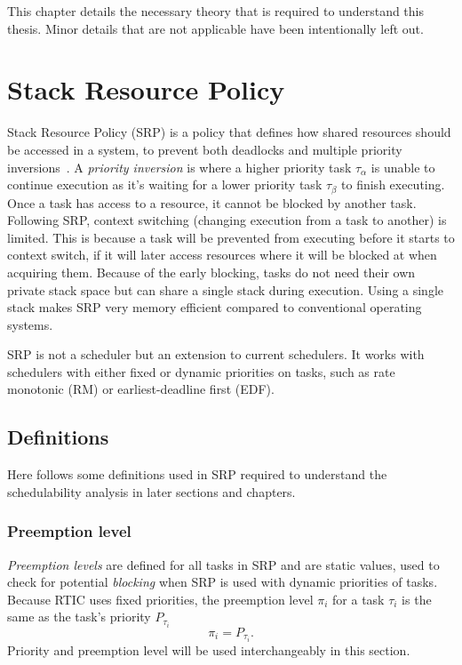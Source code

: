 This chapter details the necessary theory that is required to understand this thesis.
Minor details that are not applicable have been intentionally left out.

\section{Stack Resource Policy}
\label{theory:srp}
Stack Resource Policy (SRP) is a policy that defines how shared resources
should be accessed in a system, to prevent both deadlocks and multiple priority
inversions~\cite{srp}. A \emph{priority inversion} is where a higher priority
task $\tau_\alpha$ is unable to continue execution as it's waiting for a lower
priority task $\tau_\beta$ to finish executing. Once a task has access to a
resource, it cannot be blocked by another task. Following SRP, context
switching (changing execution from a task to another) is limited. This is
because a task will be prevented from executing before it starts to context
switch, if it will later access resources where it will be blocked at when
acquiring them. Because of the early blocking, tasks do not need their own
private stack space but can share a single stack during execution. Using a
single stack makes SRP very memory efficient compared to conventional operating
systems\cite{hardrealtimecomputingsystems}.

SRP is not a scheduler but an extension to current schedulers. It works with
schedulers with either fixed or dynamic priorities on tasks, such as rate
monotonic (RM) or earliest-deadline first (EDF).

\subsection{Definitions}
\label{theory:srp:definitions}
Here follows some definitions used in SRP required to understand the
schedulability analysis in later sections and chapters.

\subsubsection{Preemption level}
\label{theory:srp:definitions:preemption}
\emph{Preemption levels} are defined for all tasks in SRP and are static
values, used to check for potential \emph{blocking} when SRP is used with
dynamic priorities of tasks. Because RTIC uses fixed priorities, the
preemption level $\pi_i$ for a task $\tau_i$ is the same as the task's priority
$P_{\tau_i}$
\begin{equation}
    \pi_i = P_{\tau_i}.
\end{equation}
Priority and preemption level will be used interchangeably in this section.

